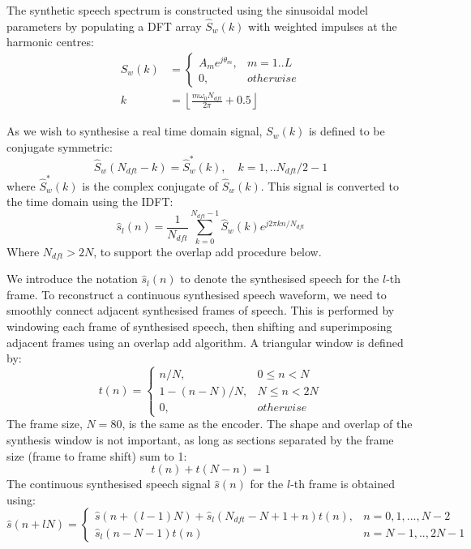 \documentclass{article}
\begin{document}
The synthetic speech spectrum is constructed using the sinusoidal model parameters by populating a DFT array $\hat{S}_w(k)$ with weighted impulses at the harmonic centres:
\begin{equation}
\begin{split}
\hat{S}_w(k) &= \begin{cases}
                A_m e^{j\theta_m}, & m=1..L \\
                0, & otherwise
                \end{cases} \\
k &= \left \lfloor \frac{m \omega_0 N_{dft}}{2 \pi} + 0.5 \right \rfloor
\end{split}
\end{equation}

As we wish to synthesise a real time domain signal, $S_w(k)$ is defined to be conjugate symmetric:
\begin{equation}
\hat{S}_w(N_{dft}-k) = \hat{S}_w^{*}(k), \quad k = 1,.. N_{dft}/2-1
\end{equation}
where $\hat{S}_w^*(k)$ is the complex conjugate of $\hat{S}_w(k)$. This signal is converted to the time domain
using the IDFT:
\begin{equation}
\label{eq:synth_idft}
\hat{s}_l(n) = \frac{1}{N_{dft}}\sum_{k=0}^{N_{dft}-1} \hat{S}_w(k) e^{j 2 \pi k n / N_{dft}}
\end{equation}
Where $N_{dft} > 2N$, to support the overlap add procedure below.

We introduce the notation $\hat{s}_l(n)$ to denote the synthesised speech for the $l$-th frame. To reconstruct a continuous synthesised speech waveform, we need to smoothly connect adjacent synthesised frames of speech. This is performed by windowing each frame of synthesised speech, then shifting and superimposing adjacent frames using an overlap add algorithm. A triangular window is defined by:
\begin{equation}
t(n) = \begin{cases}
          n/N,         & 0 \le n < N  \\
          1 - (n-N)/N, & N \le n < 2N \\ 
          0,           & otherwise
       \end{cases}
\end{equation}
The frame size, $N=80$, is the same as the encoder. The shape and overlap of the synthesis window is not important, as long as sections separated by the frame size (frame to frame shift) sum to 1:
\begin{equation}
t(n) + t(N-n) = 1
\end{equation}
The continuous synthesised speech signal $\hat{s}(n)$ for the $l$-th frame is obtained using:
\begin{equation}
\hat{s}(n+lN) = \begin{cases}
                    \hat{s}(n+(l-1)N) + \hat{s}_l(N_{dft}-N+1+n)t(n), & n=0,1,...,N-2 \\ 
		            \hat{s}_l(n - N - 1)t(n)                                    & n=N-1,..,2N-1
                  \end{cases}
\end{equation}
\end{document}

